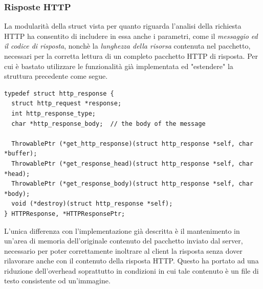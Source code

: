 \documentclass[italian]{tktltiki2}
\begin{document}
\subsubsection*{Risposte HTTP}
La modularità della struct vista per quanto riguarda l'analisi della richiesta HTTP ha consentito di includere in essa anche i parametri, come il \emph{messaggio ed il codice di risposta}, nonchè la \emph{lunghezza della risorsa} contenuta nel pacchetto, necessari per la corretta lettura di un completo pacchetto HTTP di risposta. Per cui è bastato utilizzare le funzionalità già implementata ed "estendere" la struttura precedente come segue.
\begin{lstlisting}
typedef struct http_response {
  struct http_request *response;                           
  int http_response_type;                                 
  char *http_response_body;  // the body of the message

  ThrowablePtr (*get_http_response)(struct http_response *self, char *buffer);
  ThrowablePtr (*get_response_head)(struct http_response *self, char *head);
  ThrowablePtr (*get_response_body)(struct http_response *self, char *body);
  void (*destroy)(struct http_response *self);
} HTTPResponse, *HTTPResponsePtr;

\end{lstlisting}
L'unica differenza con l'implementazione già descritta è il mantenimento in un'area di memoria dell'originale contenuto del pacchetto inviato dal server, necessario per poter correttamente inoltrare al client la risposta senza dover rilavorare anche con il contenuto della risposta HTTP. Questo ha portato ad una riduzione dell'overhead soprattutto in condizioni in cui tale contenuto è un file di testo consistente od un'immagine.
\end{document}
